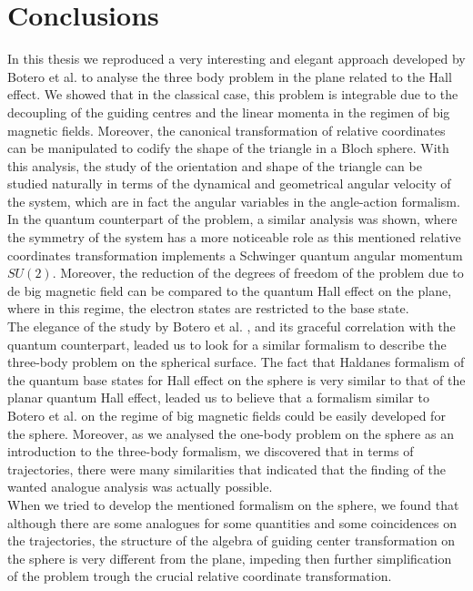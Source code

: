 \chapter{Conclusions}

In this thesis we reproduced a very interesting and elegant approach developed by Botero et al. \cite{alonso} to analyse the three body problem in the plane related to the Hall effect. We showed that in the classical case, this problem is integrable due to the decoupling of the guiding centres and the linear momenta in the regimen of big magnetic fields. Moreover, the canonical transformation of relative coordinates can be manipulated to codify the shape of the triangle in a Bloch sphere. With this analysis, the study of the orientation and shape of the triangle can be studied naturally in terms of the dynamical and geometrical angular velocity of the system, which are in fact the angular variables in the angle-action formalism.\\

In the quantum counterpart of the problem, a similar analysis was shown, where the symmetry of the system has a more noticeable role as this mentioned relative coordinates transformation implements a Schwinger quantum angular momentum $SU(2)$. Moreover, the reduction of the degrees of freedom of the problem due to de big magnetic field can be compared to the quantum Hall effect on the plane, where in this regime, the electron states are restricted to the base state.\\

The elegance of the study by Botero et al. \cite{alonso}, and its graceful correlation with the quantum counterpart, leaded us to look for a similar formalism to describe the three-body problem on the spherical surface. The fact that Haldanes \cite{haldane} formalism of the quantum base states for Hall effect on the sphere is very similar to that of the planar quantum Hall effect, leaded us to believe that a formalism similar to Botero et al. on the regime of big magnetic fields could be easily developed for the sphere. Moreover, as we analysed the one-body problem on the sphere as an introduction to the three-body formalism, we discovered that in terms of trajectories, there were many similarities that indicated that the finding of the wanted analogue analysis was actually possible.\\

When we tried to develop the mentioned formalism on the sphere, we found that although there are some analogues for some quantities and some coincidences on the trajectories, the structure of the algebra of guiding center transformation on the sphere is very different from the plane, impeding then further simplification of the problem trough the crucial relative coordinate transformation.\\

